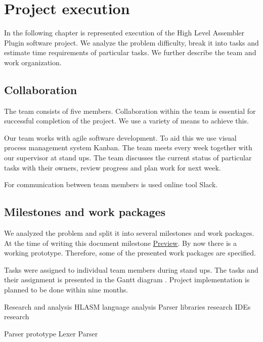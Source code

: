 \chapter{Project execution}

In the following chapter is represented execution of the High Level Assembler Plugin software project. 
We analyze the problem difficulty, break it into tasks and estimate time requirements of particular tasks.
We further describe the team and work organization.

\section{Collaboration}
The team consists of five members. Collaboration within the team is essential for successful completion of the project. We use a variety of means to achieve this. 

Our team works with agile software development. To aid this we use visual process management system Kanban. The team meets every week together with our supervisor at stand ups. The team discusses the current status of particular tasks with their owners, review progress and plan work for next week.

For communication between team members is used online tool Slack.

\section{Milestones and work packages}
We analyzed the problem and split it into several milestones and work packages. At the time of writing this document milestone \hyperref[milestone_preview]{Preview}. By now there is a working prototype. Therefore, some of the presented work packages are specified. 

Tasks were assigned to individual team members during stand ups. The tasks and their assignment  is presented in the Gantt diagram  \people{\ref{fig:gantt1}, \ref{fig:gantt2}, \ref{fig:gantt3}}. 
Project implementation is planned to be done within nine months. 

\bms
	\itemm Research and analysis 
		\bwp
			\itemwp HLASM language analysis 
			\itemwp Parser libraries research 
			\itemwp IDEs research 
		\eenum
	
	\itemm Parser prototype 
		\bwp
			\itemwp Lexer 
			\itemwp Parser 
		\eenum
	

